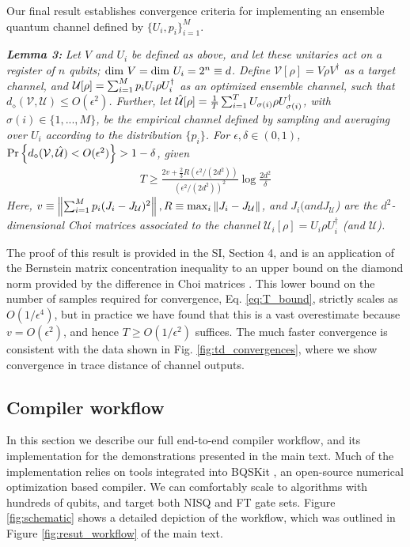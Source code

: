 Our final result establishes convergence criteria for implementing an ensemble quantum channel defined by $\{U_i, p_i\}_{i=1}^M$. 

\noindent \emph{\bf Lemma 3:} \emph{Let $V$ and $U_i$ be defined as above, and let these unitaries act on a register of $n$ qubits; \ie ${\rm dim}~ V = {\rm dim}~ U_i = 2^n \equiv d$. Define $\mathcal{V}[\rho] = V \rho V^{\dagger}$ as a target channel, and $\mathcal{U}[\rho] = \sum_{i=1}^M p_i U_i \rho U_i^\dagger$ as an optimized ensemble channel, such that $d_\diamond(\mathcal{V}, \mathcal{U})\leq O(\epsilon^2)$. Further, let $\hat{\mathcal{U}}[\rho] = \frac{1}{T}\sum_{i=1}^T U_{\sigma(i)} \rho U_{\sigma(i)}^\dagger$, with $\sigma(i)\in \{1,...,M\}$, be the empirical channel defined by sampling and averaging over $U_i$ according to the distribution $\{p_i\}$. For $\epsilon, \delta \in (0,1)$, ${\rm Pr}\left\{ d_\diamond(\mathcal{V}, \hat{\mathcal{U}}) < O(\epsilon^2) \right\} > 1-\delta$, given
\begin{align}
    T \geq \frac{2v + \frac{2}{3}R \left(\epsilon^2/(2d^2)\right) }{\left(\epsilon^2/(2d^2)\right)^2}\log \frac{2d^2}{\delta}
    \label{eq:T_bound}
\end{align}
Here, $v \equiv \left\lVert \sum_{i=1}^M p_i (J_i - J_{\mathcal{U}})^2 \right\rVert, R \equiv \max_i \left\lVert J_i - J_{\mathcal{U}} \right\rVert$, and $J_i (and J_{\mathcal{U}}$) are the $d^2$-dimensional Choi matrices associated to the channel $\mathcal{U}_i[\rho] = U_i \rho U_i^{\dagger}$ (and $\mathcal{U}$).}

The proof of this result is provided in the SI, Section 4, and is an application of the Bernstein matrix concentration inequality to an upper bound on the diamond norm provided by the difference in Choi matrices \cite{watrous_2018}. This lower bound on the number of samples required for convergence, Eq. \eqref{eq:T_bound}, strictly scales as $O(1/\epsilon^4)$, but in practice we have found that this is a vast overestimate because $v = O(\epsilon^2)$, and hence $T \geq O(1/\epsilon^2)$ suffices. The much faster convergence is consistent with the data shown in Fig. \ref{fig:td_convergences}, where we show convergence in trace distance of channel outputs.

\subsection*{Compiler workflow}
In this section we describe our full end-to-end compiler workflow, and its implementation for the demonstrations presented in the main text. Much of the implementation relies on tools integrated into BQSKit \cite{bqskit}, an open-source numerical optimization based compiler.
We can comfortably scale to algorithms with hundreds of qubits, and target both NISQ and FT gate sets. Figure \ref{fig:schematic} shows a detailed depiction of the workflow, which was outlined in Figure \ref{fig:resut_workflow} of the main text.



